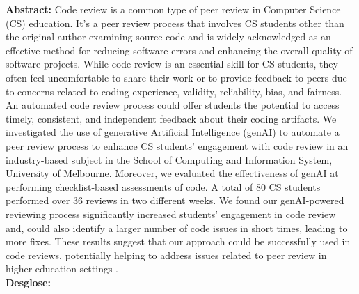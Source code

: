 \documentclass{article}
\begin{document}
\textbf{Abstract:} Code review is a common type of peer review in Computer Science (CS) education. It's a peer review process that involves CS students other than the original author examining source code and is widely acknowledged as an effective method for reducing software errors and enhancing the overall quality of software projects. While code review is an essential skill for CS students, they often feel uncomfortable to share their work or to provide feedback to peers due to concerns related to coding experience, validity, reliability, bias, and fairness. An automated code review process could offer students the potential to access timely, consistent, and independent feedback about their coding artifacts. We investigated the use of generative Artificial Intelligence (genAI) to automate a peer review process to enhance CS students' engagement with code review in an industry-based subject in the School of Computing and Information System, University of Melbourne. Moreover, we evaluated the effectiveness of genAI at performing checklist-based assessments of code. A total of 80 CS students performed over 36 reviews in two different weeks. We found our genAI-powered reviewing process significantly increased students' engagement in code review and, could also identify a larger number of code issues in short times, leading to more fixes. These results suggest that our approach could be successfully used in code reviews, potentially helping to address issues related to peer review in higher education settings \cite{Oliveira_Rios_Jiang_2023}. \\

\textbf{Desglose:}
\end{document}

